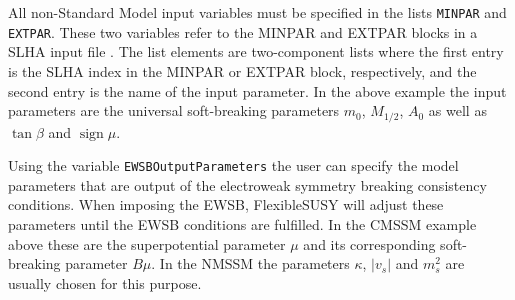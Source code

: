 \documentclass[final,3p,11pt,pdflatex]{elsarticle}
\makeatletter
\newcommand{\fs}{FlexibleSUSY\@\xspace}
\newcommand{\code}[1]{\lstinline|#1|}  %
\DeclareMathOperator{\sign}{sign}
\makeatother
\begin{document}
All non-Standard Model input variables must be specified in the lists
\code{MINPAR} and \code{EXTPAR}.  These two variables refer to the
MINPAR and EXTPAR blocks in a SLHA input file \cite{Skands:2003cj}.
The list elements are two-component lists where the first entry is the
SLHA index in the MINPAR or EXTPAR block, respectively, and the second
entry is the name of the input parameter.  In the above example the
input parameters are the universal soft-breaking parameters $m_0$,
$M_{1/2}$, $A_0$ as well as $\tan\beta$ and $\sign\mu$.

Using the variable \code{EWSBOutputParameters} the user can
specify the model parameters that are output of the electroweak
symmetry breaking consistency conditions.  When imposing the EWSB, \fs
will adjust these parameters until the EWSB conditions are fulfilled.
In the CMSSM example above these are the superpotential parameter
$\mu$ and its corresponding soft-breaking parameter $B\mu$.  In the
NMSSM the parameters $\kappa$, $|v_s|$ and $m_s^2$ are usually chosen
for this purpose.
\end{document}
